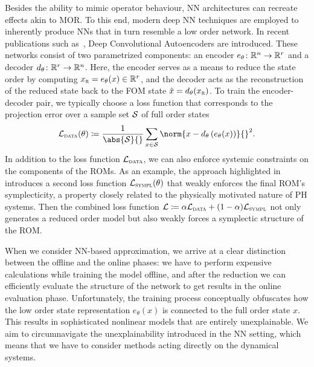 Besides the ability to mimic operator behaviour, \ac{NN} architectures can recreate effects akin to \ac{MOR}.
To this end, modern deep \ac{NN} techniques are employed to inherently produce \acp{NN} that in turn resemble a low order network.
In recent publications such as~\cite{Lee2020, Salvador2021, Benner2022, Kim2022, Buchfink2023}, Deep Convolutional Autoencoders are introduced.
These networks consist of two parametrized components: an encoder $e_\theta \colon \mathbb{R}^n \to \mathbb{R}^r$ and a decoder $d_\theta \colon \mathbb{R}^r \to \mathbb{R}^n$.
Here, the encoder serves as a means to reduce the state order by computing $x_{\textnormal{\scshape r}} = e_\theta(x) \in \mathbb{R}^r$, and the decoder acts as the reconstruction of the reduced state back to the \ac{FOM} state $\hat{x} = d_\theta(x_{\textnormal{\scshape r}})$.
To train the encoder-decoder pair, we typically choose a loss function that corresponds to the projection error over a sample set $\mathcal{S}$ of full order states
\begin{equation*}
    \mcl{L}_{\msc{data}}(\theta) \coloneqq \frac{1}{\abs{\mcl{S}}{}} \sum\limits_{x \in \mcl{S}} \norm{x - d_\theta\left( e_\theta(x) \right)}{}^2.
\end{equation*}
In addition to the loss function $\mathcal{L}_{\textnormal{\scshape data}}$, we can also enforce systemic constraints on the components of the \acp{ROM}.
As an example, the approach highlighted in~\cite{Buchfink2023} introduces a second loss function $\mathcal{L}_{\textnormal{\scshape sympl}}(\theta)$ that weakly enforces the final \ac{ROM}'s symplecticity, a property closely related to the physically motivated nature of \ac{PH} systems.
Then the combined loss function $\mathcal{L} \coloneqq \alpha \mathcal{L}_{\textnormal{\scshape data}} + (1 - \alpha) \mathcal{L}_{\textnormal{\scshape sympl}}$ not only generates a reduced order model but also weakly forces a symplectic structure of the \ac{ROM}.

When we consider \ac{NN}-based approximation, we arrive at a clear distinction between the offline and the online phases: we have to perform expensive calculations while training the model offline, and after the reduction we can efficiently evaluate the structure of the network to get results in the online evaluation phase.
Unfortunately, the training process conceptually obfuscates how the low order state representation $e_\theta(x)$ is connected to the full order state $x$.
This results in sophisticated nonlinear models that are entirely unexplainable.
We aim to circumnavigate the unexplainability introduced in the \ac{NN} setting, which means that we have to consider methods acting directly on the dynamical systems.
